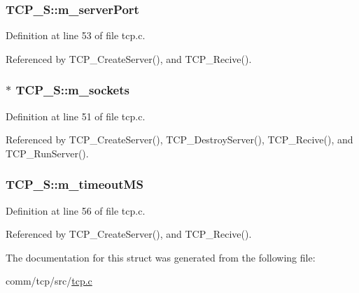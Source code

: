 \subsubsection[{\texorpdfstring{m\+\_\+server\+Port}{m_serverPort}}]{ T\+C\+P\+\_\+\+S\+::m\+\_\+server\+Port}\hypertarget{structTCP__S_ac536669390573b25c18bc10e6c26e574}{}\label{structTCP__S_ac536669390573b25c18bc10e6c26e574}


Definition at line 53 of file tcp.\+c.



Referenced by T\+C\+P\+\_\+\+Create\+Server(), and T\+C\+P\+\_\+\+Recive().

\subsubsection[{\texorpdfstring{m\+\_\+sockets}{m_sockets}}]{$\ast$ T\+C\+P\+\_\+\+S\+::m\+\_\+sockets}\hypertarget{structTCP__S_afb801954f53bf1fb313f029d88652983}{}\label{structTCP__S_afb801954f53bf1fb313f029d88652983}


Definition at line 51 of file tcp.\+c.



Referenced by T\+C\+P\+\_\+\+Create\+Server(), T\+C\+P\+\_\+\+Destroy\+Server(), T\+C\+P\+\_\+\+Recive(), and T\+C\+P\+\_\+\+Run\+Server().

\subsubsection[{\texorpdfstring{m\+\_\+timeout\+MS}{m_timeoutMS}}]{ T\+C\+P\+\_\+\+S\+::m\+\_\+timeout\+MS}\hypertarget{structTCP__S_afc87ad30c304937fd494aa6c93f39801}{}\label{structTCP__S_afc87ad30c304937fd494aa6c93f39801}


Definition at line 56 of file tcp.\+c.



Referenced by T\+C\+P\+\_\+\+Create\+Server(), and T\+C\+P\+\_\+\+Recive().



The documentation for this struct was generated from the following file\+:\begin{DoxyCompactItemize}
\item 
comm/tcp/src/\hyperlink{tcp_8c}{tcp.\+c}\end{DoxyCompactItemize}
